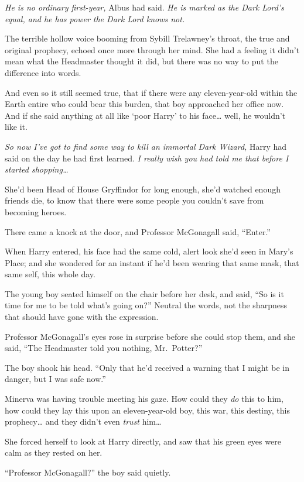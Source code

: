 \emph{He is no ordinary first-year,} Albus had said. \emph{He is marked
as the Dark Lord's equal, and he has power the Dark Lord knows not.}

The terrible hollow voice booming from Sybill Trelawney's throat, the
true and original prophecy, echoed once more through her mind. She had a
feeling it didn't mean what the Headmaster thought it did, but there was
no way to put the difference into words.

And even so it still seemed true, that if there were any eleven-year-old
within the Earth entire who could bear this burden, that boy approached
her office now. And if she said anything at all like `poor Harry' to his
face\ldots{} well, he wouldn't like it.

\emph{So now I've got to find some way to kill an immortal Dark Wizard,}
Harry had said on the day he had first learned. \emph{I really wish you
had told me that before I started shopping\ldots{}}

She'd been Head of House Gryffindor for long enough, she'd watched
enough friends die, to know that there were some people you couldn't
save from becoming heroes.

There came a knock at the door, and Professor McGonagall said,
``Enter.''

When Harry entered, his face had the same cold, alert look she'd seen in
Mary's Place; and she wondered for an instant if he'd been wearing that
same mask, that same self, this whole day.

The young boy seated himself on the chair before her desk, and said,
``So is it time for me to be told what's going on?'' Neutral the words,
not the sharpness that should have gone with the expression.

Professor McGonagall's eyes rose in surprise before she could stop them,
and she said, ``The Headmaster told you nothing, Mr.~Potter?''

The boy shook his head. ``Only that he'd received a warning that I might
be in danger, but I was safe now.''

Minerva was having trouble meeting his gaze. How could they \emph{do}
this to him, how could they lay this upon an eleven-year-old boy, this
war, this destiny, this prophecy\ldots{} and they didn't even
\emph{trust} him\ldots{}

She forced herself to look at Harry directly, and saw that his green
eyes were calm as they rested on her.

``Professor McGonagall?'' the boy said quietly.

